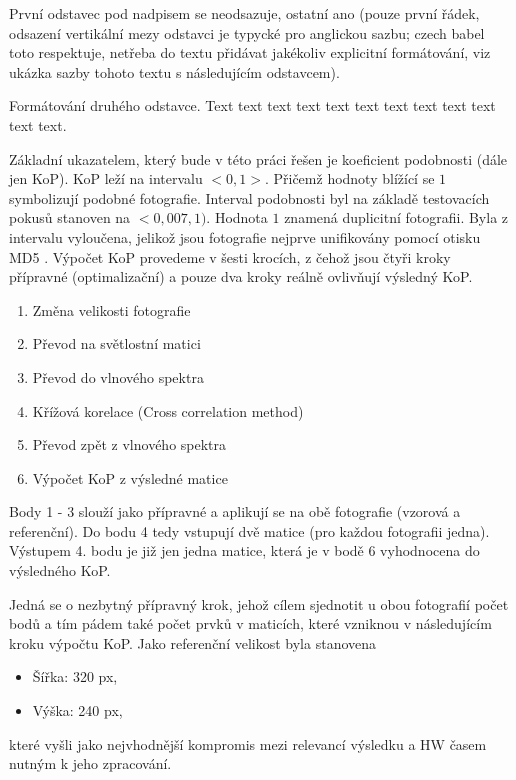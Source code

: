 
První odstavec pod nadpisem se neodsazuje, ostatní ano (pouze první řádek, odsazení vertikální mezy odstavci je typycké pro anglickou sazbu; czech babel toto respektuje, netřeba do textu přidávat jakékoliv explicitní formátování, viz ukázka sazby tohoto textu s následujícím odstavcem).

Formátování druhého odstavce. Text text text text text text text text text text text text.



Základní ukazatelem, který bude v této práci řešen je koeficient podobnosti (dále jen KoP). KoP leží na intervalu $ <0,1> $. Přičemž hodnoty blížící se $ 1 $ symbolizují podobné fotografie. Interval podobnosti byl na základě testovacích pokusů stanoven na $ <0,007, 1) $. Hodnota $ 1 $ znamená duplicitní fotografii. Byla z intervalu vyloučena, jelikož jsou fotografie nejprve unifikovány pomocí otisku MD5 \cite{md5}.
Výpočet KoP provedeme v šesti krocích, z čehož jsou čtyři kroky přípravné (optimalizační) a pouze dva kroky reálně ovlivňují výsledný KoP.
\begin{enumerate}
	\setlength{\parskip}{0pt}
	\setlength{\itemsep}{0pt}
	\item {Změna velikosti fotografie}
	\item {Převod na světlostní matici}
	\item {Převod do vlnového spektra}
	\item {Křížová korelace (Cross correlation method)}
	\item {Převod zpět z vlnového spektra}
	\item {Výpočet KoP z výsledné matice}
\end{enumerate}
Body 1 - 3 slouží jako přípravné a aplikují se na obě fotografie (vzorová a referenční). Do bodu 4 tedy vstupují dvě matice (pro každou fotografii jedna). Výstupem 4. bodu je již jen jedna matice, která je v bodě 6 vyhodnocena do výsledného KoP.

Jedná se o nezbytný přípravný krok, jehož cílem sjednotit u obou fotografií počet bodů a tím pádem také počet prvků v maticích, které vzniknou v následujícím kroku výpočtu KoP.
Jako referenční velikost byla stanovena
\begin{itemize}
	\setlength{\parskip}{0pt}
	\setlength{\itemsep}{0pt}
	\item Šířka: 320 px,
	\item Výška: 240 px,
\end{itemize}
které vyšli jako nejvhodnější kompromis mezi relevancí výsledku a HW časem nutným k jeho zpracování.

